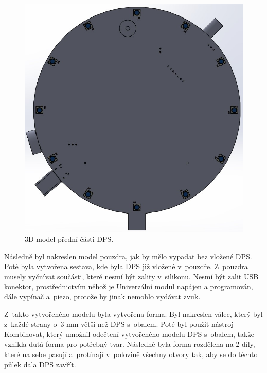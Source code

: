 \begin{figure}[!h]
  \begin{center}
    \includegraphics[scale=0.4]{obrazky/3D_model_predni.jpg}
  \end{center}
  \caption[3D model přední části DPS]{3D model přední části DPS.}
\end{figure}

Následně byl nakreslen model pouzdra, jak by mělo vypadat bez vložené DPS. Poté byla vytvořena sestava, kde byla DPS již vložené v~pouzdře. Z~pouzdra musely vyčnívat součásti, které nesmí být 
zality v~silikonu. Nesmí být zalit USB konektor, prostřednictvím něhož je Univerzální modul napájen a programován, dále vypínač a~piezo, protože by jinak nemohlo vydávat zvuk. 

Z~takto vytvořeného modelu byla vytvořena forma. Byl nakreslen válec, který byl z~každé strany o~3 mm větší než DPS s~obalem. Poté byl použit nástroj Kombinovat, který umožnil odečtení vytvořeného 
modelu DPS s~obalem, takže vznikla dutá forma pro potřebný tvar. Následně byla forma rozdělena na 2 díly, které na sebe pasují a~protínají v~polovině všechny otvory tak, aby se do těchto půlek 
dala DPS zavřít.

